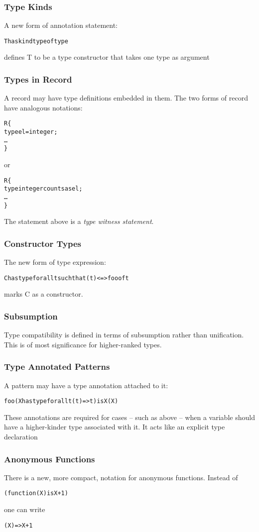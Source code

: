 \subsubsection{Type Kinds}
A new form of annotation statement:
\begin{alltt}
T has kind type of type
\end{alltt}
defines T to be a type constructor that takes one type as argument

\subsubsection{Types in Record}
A record may have type definitions embedded in them. The two forms of record have analogous notations:
\begin{alltt}
R\{
  type el = integer;
  \ldots
\}
\end{alltt}
or
\begin{alltt}
R\{
  type integer counts as el;
  \ldots
\}
\end{alltt}
The statement above is a \emph{type witness statement}.

\subsubsection{Constructor Types}
The new form of type expression:
\begin{alltt}
C has type for all t such that (t)<=>foo of t
\end{alltt}
marks C as a constructor.

\subsubsection{Subsumption}
Type compatibility is defined in terms of subsumption rather than unification.
This is of most significance for higher-ranked types.

\subsubsection{Type Annotated Patterns}
A pattern may have a type annotation attached to it:
\begin{alltt}
foo(X has type for all t (t)=>t) is X(X)
\end{alltt}
These annotations are required for cases -- such as above -- when a variable should have a higher-kinder type associated with it. It acts like an explicit type declaration

\subsubsection{Anonymous Functions}
There is a new, more compact, notation for anonymous functions. Instead of 
\begin{alltt}
(function(X) is X+1)
\end{alltt}
one can write
\begin{alltt}
(X) => X+1
\end{alltt}

